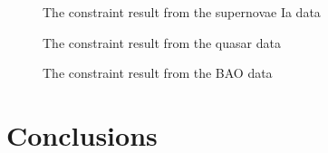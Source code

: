 \documentclass[twocolumn]{aastex631}
\begin{document}
   \begin{figure}[htbp]
      \centering
      \caption{The constraint result from the supernovae
      Ia data}
   \end{figure}

   \begin{figure}[htbp]
      \centering
      \caption{The constraint result from the quasar data}
   \end{figure}

   \begin{figure}[htbp]
      \centering
      \caption{The constraint result from the BAO data}
   \end{figure}

\section{Conclusions}



\end{document}
